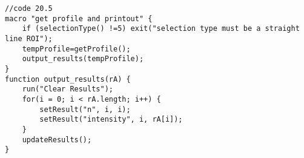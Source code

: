 \begin{lstlisting}[morekeywords={*, newArray, selectionType, getProfile, setResult, updateResults}]
//code 20.5
macro "get profile and printout" {
	if (selectionType() !=5) exit("selection type must be a straight line ROI");
	tempProfile=getProfile();
	output_results(tempProfile);
} 
function output_results(rA) {
	run("Clear Results");
	for(i = 0; i < rA.length; i++) { 
		setResult("n", i, i);
		setResult("intensity", i, rA[i]);
	}
	updateResults();
}

\end{lstlisting}